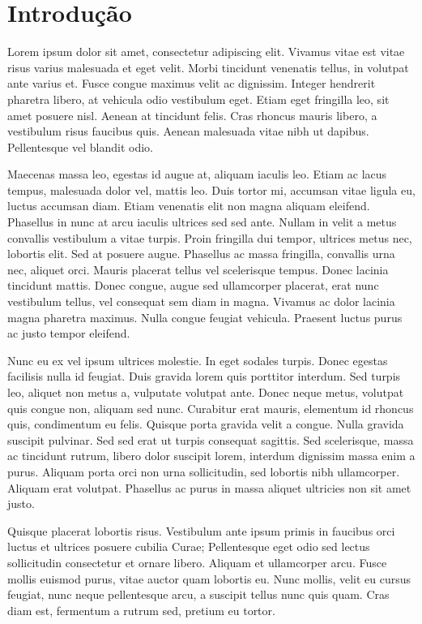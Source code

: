 \chapter{Introdução}

Lorem ipsum dolor sit amet, consectetur adipiscing elit. Vivamus vitae est vitae risus varius malesuada et eget velit. Morbi tincidunt venenatis tellus, in volutpat ante varius et. Fusce congue maximus velit ac dignissim. Integer hendrerit pharetra libero, at vehicula odio vestibulum eget. Etiam eget fringilla leo, sit amet posuere nisl. Aenean at tincidunt felis. Cras rhoncus mauris libero, a vestibulum risus faucibus quis. Aenean malesuada vitae nibh ut dapibus. Pellentesque vel blandit odio.

Maecenas massa leo, egestas id augue at, aliquam iaculis leo. Etiam ac lacus tempus, malesuada dolor vel, mattis leo. Duis tortor mi, accumsan vitae ligula eu, luctus accumsan diam. Etiam venenatis elit non magna aliquam eleifend. Phasellus in nunc at arcu iaculis ultrices sed sed ante. Nullam in velit a metus convallis vestibulum a vitae turpis. Proin fringilla dui tempor, ultrices metus nec, lobortis elit. Sed at posuere augue. Phasellus ac massa fringilla, convallis urna nec, aliquet orci. Mauris placerat tellus vel scelerisque tempus. Donec lacinia tincidunt mattis. Donec congue, augue sed ullamcorper placerat, erat nunc vestibulum tellus, vel consequat sem diam in magna. Vivamus ac dolor lacinia magna pharetra maximus. Nulla congue feugiat vehicula. Praesent luctus purus ac justo tempor eleifend.

Nunc eu ex vel ipsum ultrices molestie. In eget sodales turpis. Donec egestas facilisis nulla id feugiat. Duis gravida lorem quis porttitor interdum. Sed turpis leo, aliquet non metus a, vulputate volutpat ante. Donec neque metus, volutpat quis congue non, aliquam sed nunc. Curabitur erat mauris, elementum id rhoncus quis, condimentum eu felis. Quisque porta gravida velit a congue. Nulla gravida suscipit pulvinar. Sed sed erat ut turpis consequat sagittis. Sed scelerisque, massa ac tincidunt rutrum, libero dolor suscipit lorem, interdum dignissim massa enim a purus. Aliquam porta orci non urna sollicitudin, sed lobortis nibh ullamcorper. Aliquam erat volutpat. Phasellus ac purus in massa aliquet ultricies non sit amet justo.

Quisque placerat lobortis risus. Vestibulum ante ipsum primis in faucibus orci luctus et ultrices posuere cubilia Curae; Pellentesque eget odio sed lectus sollicitudin consectetur et ornare libero. Aliquam et ullamcorper arcu. Fusce mollis euismod purus, vitae auctor quam lobortis eu. Nunc mollis, velit eu cursus feugiat, nunc neque pellentesque arcu, a suscipit tellus nunc quis quam. Cras diam est, fermentum a rutrum sed, pretium eu tortor.


